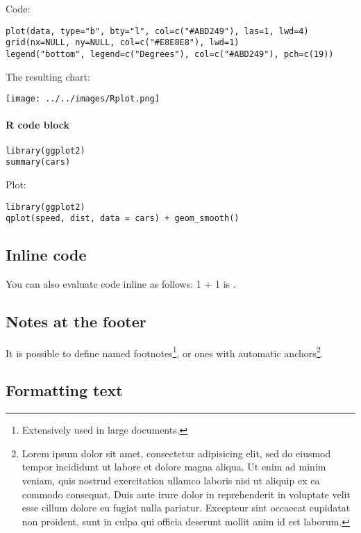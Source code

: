 \documentclass[11pt]{article}
\begin{document}
Code:

\begin{verbatim}
plot(data, type="b", bty="l", col=c("#ABD249"), las=1, lwd=4)
grid(nx=NULL, ny=NULL, col=c("#E8E8E8"), lwd=1)
legend("bottom", legend=c("Degrees"), col=c("#ABD249"), pch=c(19))
\end{verbatim}

The resulting chart:

\begin{center}
\texttt{[image: ../../images/Rplot.png]}
\end{center}

\paragraph*{R code block}
\label{sec:orgb294c4a}

\begin{verbatim}
library(ggplot2)
summary(cars)
\end{verbatim}

Plot:

\begin{verbatim}
library(ggplot2)
qplot(speed, dist, data = cars) + geom_smooth()
\end{verbatim}

\subsection*{Inline code}
\label{sec:org99ae7a0}

You can also evaluate code inline as follows: 1 + 1 is .

\subsection*{Notes at the footer}
\label{sec:orgb255297}

It is possible to define named footnotes\footnote{Extensively used in large documents.}, or ones with
automatic anchors\footnote{Lorem ipsum dolor sit amet, consectetur adipisicing elit, sed do
eiusmod tempor incididunt ut labore et dolore magna aliqua. Ut enim ad minim
veniam, quis nostrud exercitation ullamco laboris nisi ut aliquip ex ea
commodo consequat. Duis aute irure dolor in reprehenderit in voluptate velit
esse cillum dolore eu fugiat nulla pariatur. Excepteur sint occaecat cupidatat
non proident, sunt in culpa qui officia deserunt mollit anim id est laborum.}.

\subsection*{Formatting text}
\label{sec:org30596a7}
\end{document}
